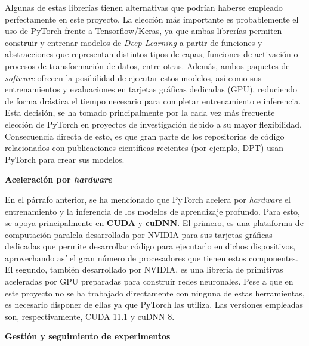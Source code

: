 Algunas de estas librerías tienen alternativas que podrían haberse empleado perfectamente en este proyecto. La elección más importante es probablemente el uso de PyTorch frente a Tensorflow/Keras, ya que ambas librerías permiten construir y entrenar modelos de \textit{Deep Learning} a partir de funciones y abstracciones que representan distintos tipos de capas, funciones de activación o procesos de transformación de datos, entre otras. Además, ambos paquetes de \textit{software} ofrecen la posibilidad de ejecutar estos modelos, así como sus entrenamientos y evaluaciones en tarjetas gráficas dedicadas (GPU), reduciendo de forma drástica el tiempo necesario para completar entrenamiento e inferencia. Esta decisión, se ha tomado principalmente por la cada vez más frecuente elección de PyTorch en proyectos de investigación debido a su mayor flexibilidad. Consecuencia directa de esto, es que gran parte de los repositorios de código relacionados con publicaciones científicas recientes (por ejemplo, DPT) usan PyTorch para crear sus modelos.

\textbf{Aceleración por \textit{hardware}}

En el párrafo anterior, se ha mencionado que PyTorch acelera por \textit{hardware} el entrenamiento y la inferencia de los modelos de aprendizaje profundo. Para esto, se apoya principalmente en \textbf{CUDA} y \textbf{cuDNN}. El primero, es una plataforma de computación paralela desarrollada por NVIDIA para sus tarjetas gráficas dedicadas que permite desarrollar código para ejecutarlo en dichos dispositivos, aprovechando así el gran número de procesadores que tienen estos componentes. El segundo, también desarrollado por NVIDIA, es una librería de primitivas aceleradas por GPU preparadas para construir redes neuronales. Pese a que en este proyecto no se ha trabajado directamente con ninguna de estas herramientas, es necesario disponer de ellas ya que PyTorch las utiliza. Las versiones empleadas son, respectivamente, CUDA 11.1 y cuDNN 8.

\textbf{Gestión y seguimiento de experimentos}

